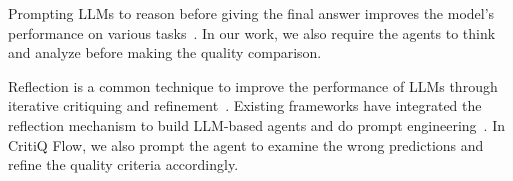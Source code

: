 Prompting
LLMs to reason before giving the final answer improves the model's
performance on various tasks~\citep{kojima_large_2023,yao_react_2023}. In our work, we also require the agents to think
and analyze before making the quality comparison.

Reflection is a common technique to improve the performance of LLMs through
iterative critiquing and refinement~\citep{shinn_reflexion_2023,madaan_self-refine_2023,saunders_self-critiquing_2022,xi2024enhancingllmreasoningcritique}.
Existing frameworks have integrated the reflection mechanism to build LLM-based
agents and do prompt engineering~\citep{yuksekgonul_textgrad_2024,asai_self-rag_2023,wu_autogen_2023}.
In CritiQ Flow, we also prompt the agent to
examine the wrong predictions and refine the quality criteria accordingly.

